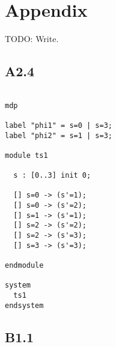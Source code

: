 
\section{Appendix}

TODO: Write.

\subsection{A2.4}

\begin{verbatim}

mdp

label "phi1" = s=0 | s=3;
label "phi2" = s=1 | s=3;

module ts1
  
  s : [0..3] init 0;

  [] s=0 -> (s'=1);
  [] s=0 -> (s'=2);
  [] s=1 -> (s'=1);
  [] s=2 -> (s'=2);
  [] s=2 -> (s'=3);
  [] s=3 -> (s'=3);

endmodule

system
  ts1
endsystem

\end{verbatim}

\subsection{B1.1}

